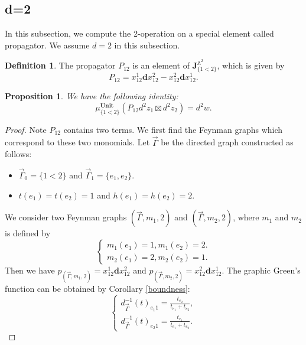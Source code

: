 \documentclass[11pt]{amsart}
\newtheorem{prop}[thm]{Proposition}
\theoremstyle{definition}
\newtheorem{defn}[thm]{Definition}
\theoremstyle{remark}
\numberwithin{equation}{section}
\begin{document}
\subsection{d=2}
In this subsection, we compute the 2-operation on a special element called propagator. We assume $d=2$ in this subsection.
\begin{defn}
    The propagator $P_{12}$ is an element of $\mathbf{J}_{\{1<2\}}^{\mathbb{A}^{2}}$, which is given by 
    $$
    P_{12}=x_{12}^1\mathbf{d}x_{12}^{2}-x_{12}^2\mathbf{d}x_{12}^{1}.
    $$
    \begin{prop}
        We have the following identity:
        $$
        \mu^{\mathbf{Unit}}_{\{1<2\}}(P_{12}d^{2}z_{1}\boxtimes d^{2}z_{2})=d^{2}w.
        $$
    \end{prop}
    \begin{proof}
    Note $P_{12}$ contains two terms. We first find the Feynman graphs which correspond to these two monomials. Let $\vec{\Gamma}$ be the directed graph constructed as follows:
        \begin{itemize}
            \item $\vec{\Gamma}_{0}=\{1<2\}$ and $\vec{\Gamma}_{1}=\{e_{1},e_{2}\}$.
            \item $t(e_{1})=t(e_{2})=1$ and $h(e_{1})=h(e_{2})=2$.
        \end{itemize}
        We consider two Feynman graphs $(\vec{\Gamma},m_{1},2)$ and $(\vec{\Gamma},m_{2},2)$, where $m_{1}$ and $m_{2}$ is defined by
        $$
        \begin{cases}
            m_{1}(e_{1})=1, m_{1}(e_{2})=2.\\
            m_{2}(e_{1})=2, m_{2}(e_{2})=1.
        \end{cases}
        $$
        Then we have $p_{(\vec{\Gamma},m_{1},2)}=x_{12}^1\mathbf{d}x_{12}^{2}$ and $p_{(\vec{\Gamma},m_{2},2)}=x_{12}^{2}\mathbf{d}x_{12}^{1}$. The graphic Green's function can be obtained by Corollary \ref{boundness}:
        $$
        \begin{cases}
            d^{-1}_{\vec{\Gamma}}(t)_{e_{1}1}=\frac{t_{e_{2}}}{t_{e_{1}}+t_{e_{2}}},\\
            d^{-1}_{\vec{\Gamma}}(t)_{e_{2}1}=\frac{t_{e_{1}}}{t_{e_{1}}+t_{e_{2}}}.
        \end{cases}
        $$
        

\end{proof}
\end{defn}
\end{document}
